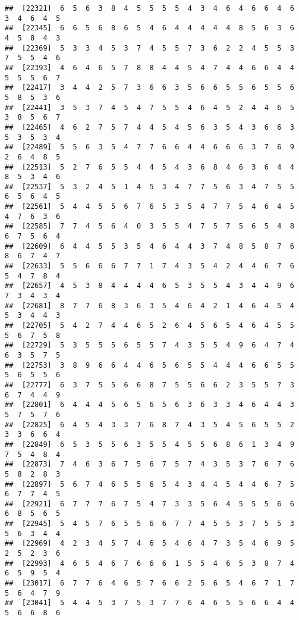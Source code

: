 \documentclass[
]{book}
\begin{document}
\begin{verbatim}
##  [22321]  6  5  6  3  8  4  5  5  5  5  4  3  4  6  4  6  6  4  6  3  4  6  4  5
##  [22345]  6  6  5  6  8  6  5  4  6  4  4  4  4  4  8  5  6  3  6  4  5  8  4  3
##  [22369]  5  3  3  4  5  3  7  4  5  5  7  3  6  2  2  4  5  5  3  7  5  5  4  6
##  [22393]  4  6  4  6  5  7  8  8  4  4  5  4  7  4  4  6  6  4  4  5  5  5  6  7
##  [22417]  3  4  4  2  5  7  3  6  6  3  5  6  6  5  5  6  5  5  6  5  8  5  3  6
##  [22441]  3  5  3  7  4  5  4  7  5  5  4  6  4  5  2  4  4  6  5  3  8  5  6  7
##  [22465]  4  6  2  7  5  7  4  4  5  4  5  6  3  5  4  3  6  6  3  5  3  5  3  4
##  [22489]  5  5  6  3  5  4  7  7  6  6  4  4  6  6  6  3  7  6  9  2  6  4  8  5
##  [22513]  5  2  7  6  5  5  4  4  5  4  3  6  8  4  6  3  6  4  4  8  5  3  4  6
##  [22537]  5  3  2  4  5  1  4  5  3  4  7  7  5  6  3  4  7  5  5  6  5  6  4  5
##  [22561]  5  4  4  5  5  6  7  6  5  3  5  4  7  7  5  4  6  4  5  4  7  6  3  6
##  [22585]  7  7  4  5  6  4  0  3  5  5  4  7  5  7  5  6  5  4  8  6  7  5  6  4
##  [22609]  6  4  4  5  5  3  5  4  6  4  4  3  7  4  8  5  8  7  6  8  6  7  4  7
##  [22633]  5  5  6  6  6  7  7  1  7  4  3  5  4  2  4  4  6  7  6  5  4  7  8  4
##  [22657]  4  5  3  8  4  4  4  4  6  5  3  5  5  4  3  4  4  9  6  7  3  4  3  4
##  [22681]  8  7  7  6  8  3  6  3  5  4  6  4  2  1  4  6  4  5  4  5  3  4  4  3
##  [22705]  5  4  2  7  4  4  6  5  2  6  4  5  6  5  4  6  4  5  5  5  6  7  5  8
##  [22729]  5  3  5  5  5  6  5  5  7  4  3  5  5  4  9  6  4  7  4  6  3  5  7  5
##  [22753]  3  8  9  6  6  4  4  6  5  6  5  5  4  4  4  6  6  5  5  5  6  5  5  6
##  [22777]  6  3  7  5  5  6  6  8  7  5  5  6  6  2  3  5  5  7  3  6  7  4  4  9
##  [22801]  6  4  4  4  5  6  5  6  5  6  3  6  3  3  4  6  4  4  3  5  7  5  7  6
##  [22825]  6  4  5  4  3  3  7  6  8  7  4  3  5  4  5  6  5  5  2  3  3  6  6  4
##  [22849]  6  5  3  5  5  6  3  5  5  4  5  5  6  8  6  1  3  4  9  7  5  4  8  4
##  [22873]  7  4  6  3  6  7  5  6  7  5  7  4  3  5  3  7  6  7  6  5  8  2  8  3
##  [22897]  5  6  7  4  6  5  5  6  5  4  3  4  4  5  4  4  6  7  5  6  7  7  4  5
##  [22921]  6  7  7  7  6  7  5  4  7  3  3  5  6  4  5  5  5  6  6  6  8  5  6  5
##  [22945]  5  4  5  7  6  5  5  6  6  7  7  4  5  5  3  7  5  5  3  5  6  3  4  4
##  [22969]  4  2  3  4  5  7  4  6  5  4  6  4  7  3  5  4  6  9  5  2  5  2  3  6
##  [22993]  4  6  5  4  6  7  6  6  6  1  5  5  4  6  5  3  8  7  4  6  5  9  5  4
##  [23017]  6  7  7  6  4  6  5  7  6  6  2  5  6  5  4  6  7  1  7  5  6  4  7  9
##  [23041]  5  4  4  5  3  7  5  3  7  7  6  4  6  5  5  6  6  4  4  5  6  6  8  6

\end{verbatim}
\end{document}
